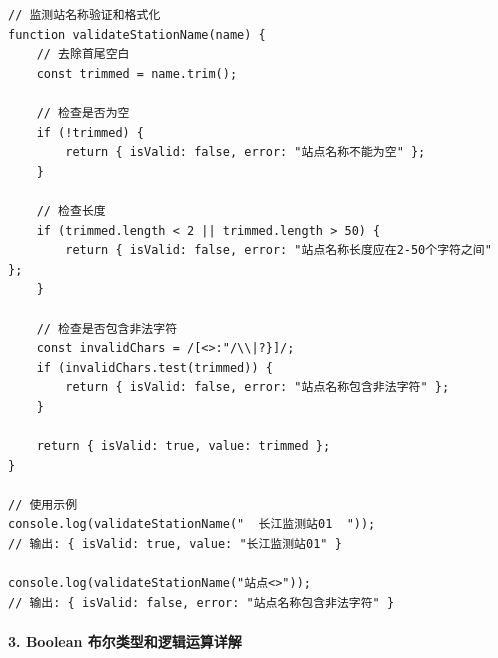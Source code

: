 \begin{lstlisting}[style=javascript]
// 监测站名称验证和格式化
function validateStationName(name) {
    // 去除首尾空白
    const trimmed = name.trim();
    
    // 检查是否为空
    if (!trimmed) {
        return { isValid: false, error: "站点名称不能为空" };
    }
    
    // 检查长度
    if (trimmed.length < 2 || trimmed.length > 50) {
        return { isValid: false, error: "站点名称长度应在2-50个字符之间" };
    }
    
    // 检查是否包含非法字符
    const invalidChars = /[<>:"/\\|?}]/;
    if (invalidChars.test(trimmed)) {
        return { isValid: false, error: "站点名称包含非法字符" };
    }
    
    return { isValid: true, value: trimmed };
}

// 使用示例
console.log(validateStationName("  长江监测站01  ")); 
// 输出: { isValid: true, value: "长江监测站01" }

console.log(validateStationName("站点<>"));
// 输出: { isValid: false, error: "站点名称包含非法字符" }
\end{lstlisting}

\hypertarget{boolean-ux5e03ux5c14ux7c7bux578bux548cux903bux8f91ux8fd0ux7b97ux8be6ux89e3}{%
\paragraph{3. Boolean 布尔类型和逻辑运算详解}\label{boolean-ux5e03ux5c14ux7c7bux578bux548cux903bux8f91ux8fd0ux7b97ux8be6ux89e3}}

